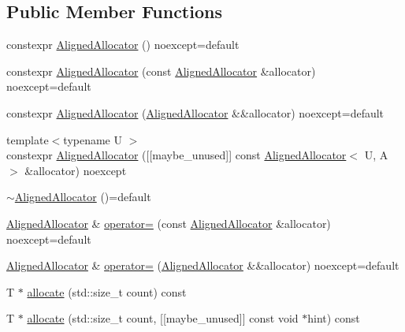 \subsection*{Public Member Functions}
\begin{DoxyCompactItemize}
\item 
constexpr \mbox{\hyperlink{classmage_1_1_aligned_allocator_a87d49f18fe80cb61ff75cc6d9a8c4949}{Aligned\+Allocator}} () noexcept=default
\item 
constexpr \mbox{\hyperlink{classmage_1_1_aligned_allocator_a724b0692cf3c5e217c1281eaabd1ca4b}{Aligned\+Allocator}} (const \mbox{\hyperlink{classmage_1_1_aligned_allocator}{Aligned\+Allocator}} \&allocator) noexcept=default
\item 
constexpr \mbox{\hyperlink{classmage_1_1_aligned_allocator_ac2ef3124c1e18e07bb75006c28967c11}{Aligned\+Allocator}} (\mbox{\hyperlink{classmage_1_1_aligned_allocator}{Aligned\+Allocator}} \&\&allocator) noexcept=default
\item 
{\footnotesize template$<$typename U $>$ }\\constexpr \mbox{\hyperlink{classmage_1_1_aligned_allocator_a6f671f86583ecd883fa5c6ae22fd7fcb}{Aligned\+Allocator}} (\mbox{[}\mbox{[}maybe\+\_\+unused\mbox{]}\mbox{]} const \mbox{\hyperlink{classmage_1_1_aligned_allocator}{Aligned\+Allocator}}$<$ U, A $>$ \&allocator) noexcept
\item 
\mbox{\hyperlink{classmage_1_1_aligned_allocator_aafac29097c8439629bc814d1f5bd0d24}{$\sim$\+Aligned\+Allocator}} ()=default
\item 
\mbox{\hyperlink{classmage_1_1_aligned_allocator}{Aligned\+Allocator}} \& \mbox{\hyperlink{classmage_1_1_aligned_allocator_afb59c244009982c6f61e4fd7479f40fd}{operator=}} (const \mbox{\hyperlink{classmage_1_1_aligned_allocator}{Aligned\+Allocator}} \&allocator) noexcept=default
\item 
\mbox{\hyperlink{classmage_1_1_aligned_allocator}{Aligned\+Allocator}} \& \mbox{\hyperlink{classmage_1_1_aligned_allocator_a349db9153bdafabebac1e85836637f2f}{operator=}} (\mbox{\hyperlink{classmage_1_1_aligned_allocator}{Aligned\+Allocator}} \&\&allocator) noexcept=default
\item 
T $\ast$ \mbox{\hyperlink{classmage_1_1_aligned_allocator_ac93afe4edd9d5d759374a56138087835}{allocate}} (std\+::size\+\_\+t count) const
\item 
T $\ast$ \mbox{\hyperlink{classmage_1_1_aligned_allocator_ad683d31cec6ec3729bec0972cc681800}{allocate}} (std\+::size\+\_\+t count, \mbox{[}\mbox{[}maybe\+\_\+unused\mbox{]}\mbox{]} const void $\ast$hint) const

\end{DoxyCompactItemize}
